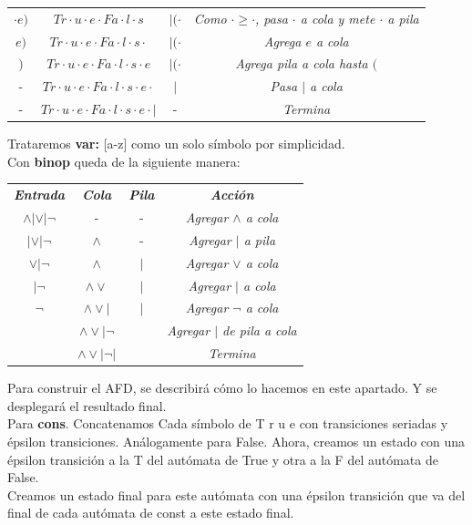 \documentclass[12pt, letterpaper]{article}
\begin{document}
\begin{enumerate}
\begin{table}[htbp]
\begin{tabular}{cccc}
        $\cdot e)$ & $Tr\cdot u\cdot e\cdot Fa\cdot l\cdot s$ & $|(\cdot$ & \textit{Como $\cdot \ge \cdot$, pasa $\cdot$ a cola y mete $\cdot$ a pila} \\
        $e)$ & $Tr\cdot u\cdot e\cdot Fa\cdot l\cdot s\cdot$ & $|(\cdot$ & \textit{Agrega $e$ a cola} \\
        $)$ & $Tr\cdot u\cdot e\cdot Fa\cdot l\cdot s\cdot e$ & $|(\cdot$ & \textit{Agrega pila a cola hasta $($} \\
        - & $Tr\cdot u\cdot e\cdot Fa\cdot l\cdot s\cdot e\cdot$ & $|$ & \textit{Pasa $|$ a cola} \\
        - & $Tr\cdot u\cdot e\cdot Fa\cdot l\cdot s\cdot e\cdot |$ & - & \textit{Termina} \\
        \bottomrule
      \end{tabular}
    \end{table}

    Trataremos \textbf{var:} [a-z] como un solo símbolo por simplicidad.\\

    \newpage
    Con \textbf{binop} queda de la siguiente manera:
    \begin{table}[htbp]
      \centering
      \begin{tabular}{cccc}
        \toprule
        \textbf{\textit{Entrada}} & \textbf{\textit{Cola}} & \textbf{\textit{Pila}} & \textbf{\textit{Acci\'on}} \\
        $\wedge|\vee|\neg$ & - & - & \textit{Agregar $\wedge$ a cola} \\
        $|\vee|\neg$ & $\wedge$ & - & \textit{Agregar $|$ a pila} \\
        $\vee|\neg$ & $\wedge$ & $|$ & \textit{Agregar $\vee$ a cola} \\
        $|\neg$ & $\wedge\vee$ & $|$ & \textit{Agregar $|$ a cola} \\
        $\neg$ & $\wedge\vee|$ & $|$ & \textit{Agregar $\neg$ a cola} \\
        $ $ & $\wedge\vee|\neg$ & $ $ & \textit{Agregar $|$ de pila a cola} \\
        $ $ & $\wedge\vee|\neg|$ & $ $ & \textit{Termina} \\
        \bottomrule
      \end{tabular}
    \end{table}

    Para construir el AFD, se describirá cómo lo hacemos en este apartado. Y se desplegará el resultado final.\\
    Para \textbf{cons}. Concatenamos Cada símbolo de T r u e con transiciones seriadas y épsilon transiciones.
    Análogamente para False. Ahora, creamos un estado con una épsilon transición a la T del autómata de True y otra a la F del autómata de False.\\
    Creamos un estado final para este autómata con una épsilon transición que va del final de cada autómata de const a este estado final.


\end{enumerate}
\end{document}
